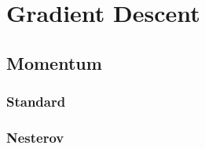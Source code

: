 \section{Gradient Descent}



\subsection{Momentum}



\subsubsection{Standard}



\subsubsection{Nesterov}